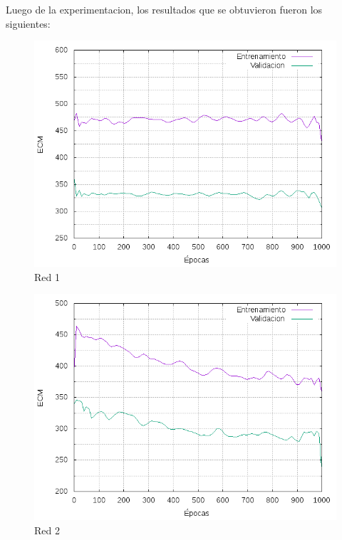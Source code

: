 Luego de la experimentacion, los resultados que se obtuvieron fueron los siguientes:
\begin{figure}[H]
  \includegraphics[width=125mm]{imagenes/ej1/ex_1-1_red_11-1_errors.png}
  \caption{Red 1}
\end{figure}

\begin{figure}[H]
  \includegraphics[width=125mm]{imagenes/ej1/ex_1-1_red_11-6-6-9-1_errors.png}
  \caption{Red 2}
\end{figure}

